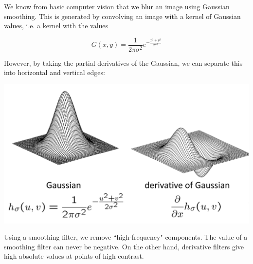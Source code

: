 \documentclass{article}
\begin{document}
We know from basic computer vision that we blur an image using Gaussian smoothing. This is generated by convolving an image with a kernel of Gaussian values, i.e. a kernel with the values

\[G(x,y) = \frac{1}{2\pi\sigma^2}e^{-\frac{x^2+y^2}{2\sigma^2}}\]

However, by taking the partial derivatives of the Gaussian, we can separate this into horizontal and vertical edges:

\begin{center}
\includegraphics[scale=0.4]{gaussian.PNG}
\end{center}

Using a smoothing filter, we remove ``high-frequency" components. The value of a smoothing filter can never be negative. On the other hand, derivative filters give high absolute values at points of high contrast.
\end{document}
